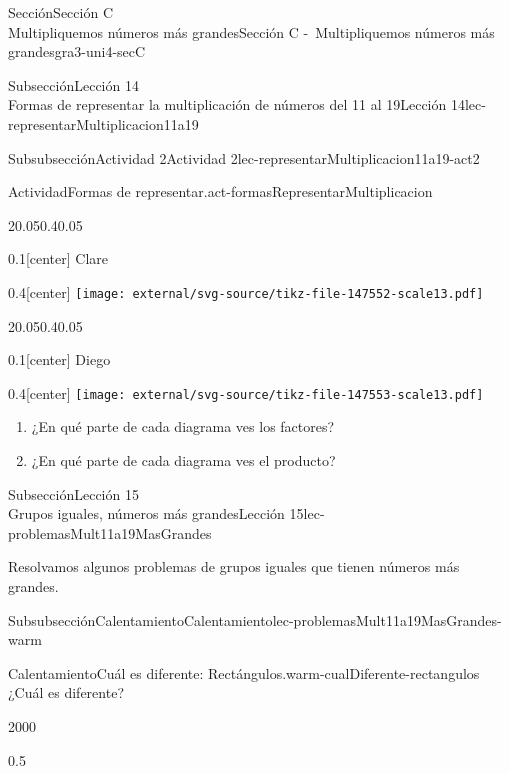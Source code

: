 \begin{sectionptx}{Sección}{{\Large Sección C\\}Multipliquemos números más grandes}{}{Sección C -~Multipliquemos números más grandes}{}{}{gra3-uni4-secC}
\begin{subsectionptx}{Subsección}{{\normalsize Lección 14\\[-0.05cm]}Formas de representar la multiplicación de números del 11 al 19}{}{Lección 14}{}{}{lec-representarMultiplicacion11a19}
\begin{subsubsectionptx}{Subsubsección}{Actividad 2}{}{Actividad 2}{}{}{lec-representarMultiplicacion11a19-act2}
\begin{activity}{Actividad}{Formas de representar.}{act-formasRepresentarMultiplicacion}
\begin{sidebyside}{2}{0.05}{0.4}{0.05}
\begin{sbspanel}{0.1}[center]%
Clare%
\end{sbspanel}%
\begin{sbspanel}{0.4}[center]%
\texttt{[image: external/svg-source/tikz-file-147552-scale13.pdf]}
\end{sbspanel}%
\end{sidebyside}%
\begin{sidebyside}{2}{0.05}{0.4}{0.05}%
\begin{sbspanel}{0.1}[center]%
Diego%
\end{sbspanel}%
\begin{sbspanel}{0.4}[center]%
\texttt{[image: external/svg-source/tikz-file-147553-scale13.pdf]}
\end{sbspanel}%
\end{sidebyside}%
%
\begin{enumerate}
\item{}¿En qué parte de cada diagrama ves los factores?%
\item{}¿En qué parte de cada diagrama ves el producto?%
\end{enumerate}
\end{activity}%
\end{subsubsectionptx}
\end{subsectionptx}
%
%
\typeout{************************************************}
\typeout{************************************************}
%
\clearpage
\begin{subsectionptx}{Subsección}{{\normalsize Lección 15\\[-0.05cm]}Grupos iguales, números más grandes}{}{Lección 15}{}{}{lec-problemasMult11a19MasGrandes}
\begin{introduction}{}%
Resolvamos algunos problemas de grupos iguales que tienen números más grandes.%
\end{introduction}%
%
%
\typeout{************************************************}
\typeout{************************************************}
%
\begin{subsubsectionptx}{Subsubsección}{Calentamiento}{}{Calentamiento}{}{}{lec-problemasMult11a19MasGrandes-warm}
\begin{exploration}{Calentamiento}{Cuál es diferente: Rectángulos.}{warm-cualDiferente-rectangulos}%
¿Cuál es diferente?%
\begin{sidebyside}{2}{0}{0}{0}%
\begin{sbspanel}{0.5}%

\end{sbspanel}
\end{sidebyside}
\end{exploration}
\end{subsubsectionptx}
\end{subsectionptx}
\end{sectionptx}
